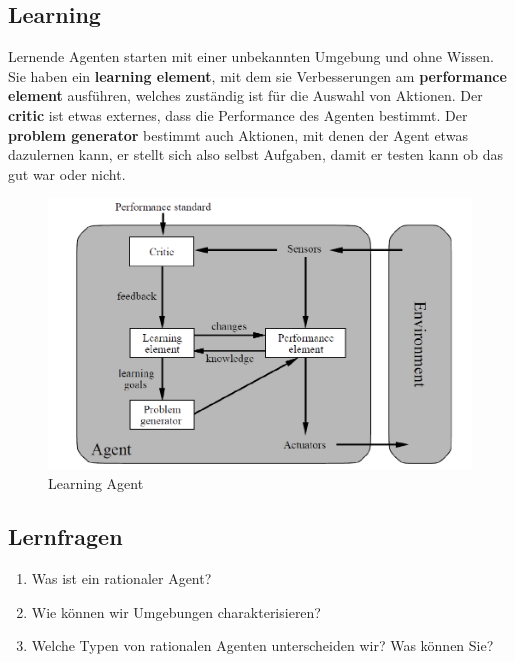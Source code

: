 \subsection{Learning}
Lernende Agenten starten mit einer unbekannten Umgebung und ohne Wissen. Sie haben ein \textbf{learning element}, mit dem sie Verbesserungen am \textbf{performance element} ausführen, welches zuständig ist für die Auswahl von Aktionen. Der \textbf{critic} ist etwas externes, dass die Performance des Agenten bestimmt. Der \textbf{problem generator} bestimmt auch Aktionen, mit denen der Agent etwas dazulernen kann, er stellt sich also selbst Aufgaben, damit er testen kann ob das gut war oder nicht.
\begin{figure}[h!]
\centering
\includegraphics[width=0.5\linewidth]{fig/learning_agent}
\caption{Learning Agent}
\label{fig:learning_agent}
\end{figure}

\subsection{Lernfragen}
\begin{enumerate}
	\item Was ist ein rationaler Agent?
	\item Wie können wir Umgebungen charakterisieren?
	\item Welche Typen von rationalen Agenten unterscheiden wir? Was können Sie?
\end{enumerate}